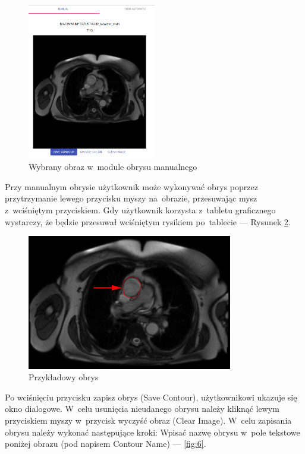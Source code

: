 \documentclass[a4paper,11pt,twoside,openright]{report}
\theoremstyle{definition}
\begin{document}
\pagebreak

\begin{figure}[h!]
	\center
	\includegraphics[width=0.5\textwidth]{4}
	\caption{Wybrany obraz w~module obrysu manualnego}
    	\label{fig:4}
\end{figure}

Przy manualnym obrysie użytkownik może wykonywać obrys poprzez przytrzymanie
lewego przycisku myszy na~obrazie, przesuwając mysz z~wciśniętym przyciskiem.
Gdy użytkownik korzysta z~tabletu graficznego wystarczy, że będzie przesuwał
wciśniętym rysikiem po~tablecie --- Rysunek \ref{fig:5}.

\begin{figure}[h!]
	\center
	\includegraphics[width=0.8\textwidth]{5}
	\caption{Przykładowy obrys}
    	\label{fig:5}
\end{figure}

\pagebreak

Po wciśnięciu przycisku zapisz obrys (Save Contour), użytkownikowi ukazuje się
okno dialogowe. W~celu usunięcia nieudanego obrysu należy kliknąć lewym przyciskiem
myszy w~przycisk wyczyść obraz (Clear Image). W~celu zapisania obrysu należy
wykonać następujące kroki: Wpisać nazwę obrysu w~pole tekstowe poniżej obrazu
(pod napisem Contour Name)  --- \ref{fig:6}.
\end{document}
